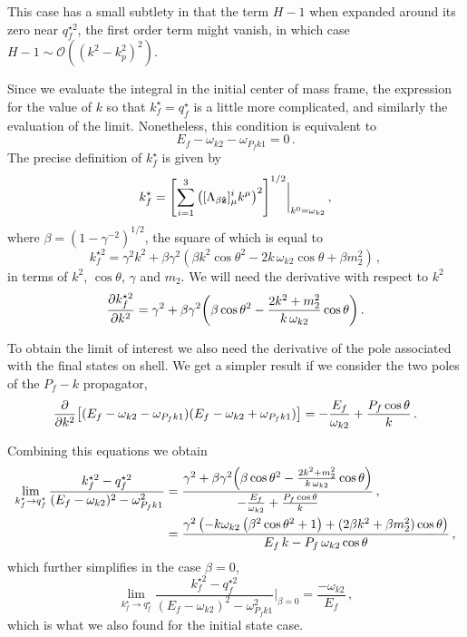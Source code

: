 \documentclass[aps,prd,onecolumn,groupedaddress]{revtex4-2}
\begin{document}
This case has a small subtlety in that the term $H-1$ when expanded around its zero near $q_f^{\star2}$, the first order term might vanish, in which case $H-1 \sim \mathcal{O}((k^2-k_p^2)^2)$.

Since we evaluate the integral in the initial center of mass frame, the expression for the value of $k$ so that $k^\star_f=q^\star_f$ is a little more complicated, and similarly the evaluation of the limit.
Nonetheless, this condition is equivalent to
\begin{equation}
    E_f-\omega_{k2} - \omega_{P_fk1} = 0\,.
\end{equation}
The precise definition of $k^\star_f$ is given by
\begin{equation}
    k^\star_f = \qty[\sum_{i=1}^3 \qty([\Lambda_{\beta\vu z}]^i_\mu k^\mu)^2]^{1/2}\bigg|_{k^0=\omega_{k2}}\,,
\end{equation}
where $\beta=(1-\gamma^{-2})^{1/2}$, the square of which is equal to
\begin{equation}
    k^{\star2}_f=\gamma^2k^2+\beta\gamma^2(\beta k^2\cos\theta^2-2k\,\omega_{k2}\cos\theta+\beta m_2^2)\,,\label{eq:kfst}
\end{equation}
in terms of $k^2$, $\cos\theta$, $\gamma$ and $m_2$.
We will need the derivative with respect to $k^2$
\begin{equation}
    \pdv{k^{\star2}_f}{k^{2}}= \gamma^2+ \beta\gamma^2\qty(\beta \cos\theta^2 -\frac{2k^2+m^2_2}{k\,\omega_{k2}} \cos\theta)\,.\label{eq:derkfst}
\end{equation}

To obtain the limit of interest we also need the derivative of the pole associated with the final states on shell.
We get a simpler result if we consider the two poles of the $P_f-k$ propagator,
\begin{equation}
    \pdv{k^{2}}\qty[(E_f-\omega_{k2} - \omega_{P_fk1} )(E_f-\omega_{k2} + \omega_{P_fk1} )] = -\frac{E_f}{\omega_{k2}}+\frac{P_f\cos\theta}{k}\,.
\end{equation}

Combining this equations we obtain
\begin{align}
     \lim_{k^{\star}_f\to q^\star_f} \frac{ k^{\star2}_f- q^{\star2}_f}{(E_f-\omega_{k2})^2-\omega_{P_fk1}^2}
     &= \frac{\gamma^2+ \beta\gamma^2\qty(\beta \cos\theta^2 -\frac{2k^2+m^2_2}{k\,\omega_{k2}} \cos\theta)}{-\frac{E_f}{\omega_{k2}}+\frac{P_f\cos\theta}{k}}\,,\\
     &= \frac{\gamma ^2 \left(-k \omega_{k2} \left(\beta ^2 \cos\theta^2+1\right)+(2 \beta  k^2 +\beta  m_2^2 )\cos\theta\right)}{E_f \,k-P_f \,\omega_{k2}\cos\theta }\,,
\end{align}
which further simplifies in the case $\beta=0$,
\begin{equation}
         \lim_{k^{\star}_f\to q^\star_f} \frac{ k^{\star2}_f- q^{\star2}_f}{(E_f-\omega_{k2})^2-\omega_{P_fk1}^2}\bigg|_{\beta=0}
     = \frac{-\omega_{k2} }{E_f}\,,
\end{equation}
which is what we also found for the initial state case.
\end{document}

